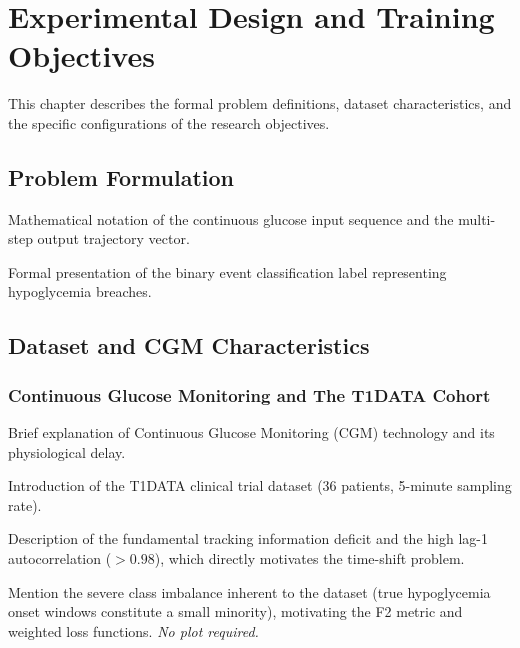\chapter{Experimental Design and Training Objectives} \label{ch:method}
This chapter describes the formal problem definitions, dataset characteristics, and the specific configurations of the research objectives.

\section{Problem Formulation} \label{sec:method:problem}
\begin{planned}
    \item Mathematical notation of the continuous glucose input sequence and the multi-step output trajectory vector.
    \item Formal presentation of the binary event classification label representing hypoglycemia breaches.
\end{planned}

\section{Dataset and CGM Characteristics} \label{sec:method:setup}
\subsection{Continuous Glucose Monitoring and The T1DATA Cohort} \label{sec:method:setup:cgm}
\begin{planned}
    \item Brief explanation of Continuous Glucose Monitoring (CGM) technology and its physiological delay.
    \item Introduction of the T1DATA clinical trial dataset (36 patients, 5-minute sampling rate).
    \item Description of the fundamental tracking information deficit and the high lag-1 autocorrelation ($> 0.98$), which directly motivates the time-shift problem.
    \item Mention the severe class imbalance inherent to the dataset (true hypoglycemia onset windows constitute a small minority), motivating the F2 metric and weighted loss functions. \textit{No plot required.}
\end{planned}

